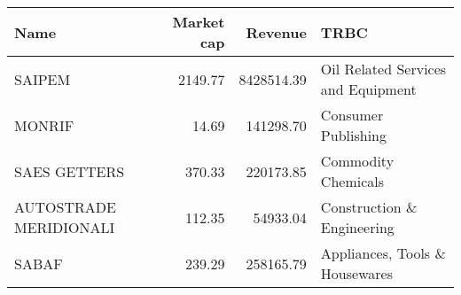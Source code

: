 \begin{tabular}{lrrl}
\toprule
                  Name &  Market cap &    Revenue &                               TRBC \\
\midrule
                SAIPEM &     2149.77 & 8428514.39 & Oil Related Services and Equipment \\
                MONRIF &       14.69 &  141298.70 &                Consumer Publishing \\
          SAES GETTERS &      370.33 &  220173.85 &                Commodity Chemicals \\
AUTOSTRADE MERIDIONALI &      112.35 &   54933.04 &         Construction \& Engineering \\
                 SABAF &      239.29 &  258165.79 &     Appliances, Tools \& Housewares \\
\bottomrule
\end{tabular}
